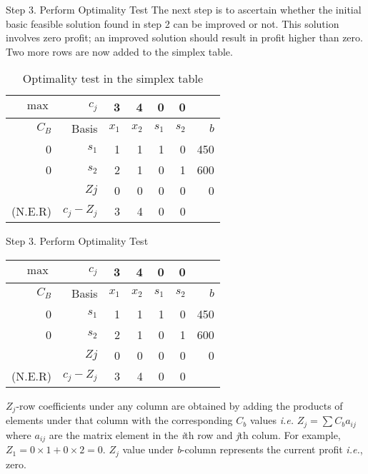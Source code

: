 \begin{frame}{Step 3. Perform Optimality Test}
  The next step is to ascertain whether the initial basic feasible solution found in step 2 can be improved or not. This solution involves zero profit; an improved solution should result in profit higher than zero. \alert{Two more rows are now added to the simplex table}.

  \begin{table}[h]
    \centering
    \caption{Optimality test in the simplex table}    \label{tab:simplex-table-optimalitytest}
    \begin{tabular}{rrrrrrr}
      \toprule
      $\max$& $c_j$  &3 &4 &0 &0 & \\
      \midrule
      $C_B$ &Basis&$x_1$&$x_2$&$s_1$&$s_2$&$b$\\
      \midrule
      0&$s_1$&1&1&1&0&450\\
      0&$s_2$&2&1&0&1&600\\
      \midrule
      &$Zj$&0&0&0&0&0\\
      (N.E.R)&$c_j - Z_j$&3&4&0&0&\\
      \bottomrule
    \end{tabular}
  \end{table}
\end{frame}

\begin{frame}{Step 3. Perform Optimality Test}{}
  {\centering
    \begin{tabular}{rrrrrrr}
      \toprule
      $\max$& $c_j$  &3 &4 &0 &0 & \\
      \midrule
      $C_B$ &Basis&$x_1$&$x_2$&$s_1$&$s_2$&$b$\\
      \midrule
      0&$s_1$&1&1&1&0&450\\
      0&$s_2$&2&1&0&1&600\\
      \midrule
      &$Zj$&\cellcolor{cyan!30}0&\cellcolor{cyan!30}0&\cellcolor{cyan!30}0&\cellcolor{cyan!30}0&0\\
      (N.E.R)&$c_j - Z_j$&3&4&0&0&\\
      \bottomrule
    \end{tabular}
    \par}

  $Z_j$-row coefficients under any column are obtained by adding the products of elements under that column with the corresponding $C_b$ values \emph{i.e.} $Z_j = \sum C_b a_{ij}$ where $a_{ij}$ are the matrix element in the \emph{i}th row and \emph{j}th colum. For example, $Z_1 = 0 \times 1 + 0 \times 2 = 0$. \alert{$Z_j$ value under \emph{b}-column represents the current profit \emph{i.e.}, zero}.
\end{frame}


